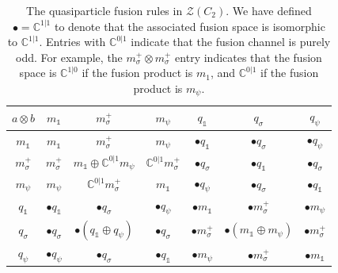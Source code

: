 \documentclass[12pt,a4paper]{article}
\newcommand{\tp}{\otimes}
\newcommand{\unit}{\mathds{1}}
\newcommand{\cc}{\mathbb{C}}
\newcommand{\mcz}{\mathcal{Z}}
\begin{document}
\begin{table}
\centering
\begin{tabular}{c||c|c|c||c|c|c}
$ {a\otimes b} $&$m_\unit $&$m_\sigma^+$&$m_\psi$&$q_\unit$&$q_\sigma$&$q_\psi $\\
     \hline
     \hline
     
$m_\unit $&$m_\unit$&$ m_\sigma^+$&$m_\psi$&    $\bullet q_\unit$&$\bullet q_\sigma$&$\bullet q_\psi$ \\

     \hline
$m_\sigma^+ $&$m_\sigma^+$&$m_\unit \oplus \cc^{0|1}m_\psi $&$ \cc^{0|1} m_\sigma^+ $&$      \bullet q_\sigma $&$ \bullet q_\unit$&$ \bullet q_\sigma$ \\

     \hline
     
$m_\psi $&$m_\psi$&$\cc^{0|1} m_\sigma^+$&$m_\unit$&      $\bullet q_\psi$&$\bullet q_\sigma$&$\bullet q_\unit $\\

     \hline
     \hline
     
$q_\unit $&$\bullet q_\unit$&$\bullet q_\sigma $&$\bullet q_\psi$&$\bullet m_\unit$&$\bullet m_\sigma^+$&$\bullet m_\psi$\\

\hline
$q_\sigma$&$\bullet q_\sigma$&$\bullet (q_\unit \oplus q_\psi)$&$\bullet q_\sigma$&$\bullet m_\sigma^+$&$\bullet (m_\unit \oplus m_\psi)$&$\bullet m_\sigma^+$ \\

\hline
$q_\psi $&$\bullet q_\psi$&$\bullet q_\sigma$&$\bullet q_\unit$&$\bullet m_\psi$&$\bullet m_\sigma^+$&$\bullet m_\unit$
\end{tabular}
\caption{ \label{fusiontable} The quasiparticle fusion rules in $\mcz(C_2)$. 
We have defined $\bullet = \mathbb{C}^{1|1}$ to denote that the associated fusion space is isomorphic to $\cc^{1|1}$.
Entries with $\cc^{0|1}$ indicate that the fusion channel is purely odd. 
For example, the $m_\sigma^+ \tp m_\sigma^+$ entry indicates that the fusion space is $\cc^{1|0}$ if the fusion product is $m_1$, and $\cc^{0|1}$ if the fusion product is $m_\psi$. }
\end{table}
 
 

 

 
 
\end{document}
